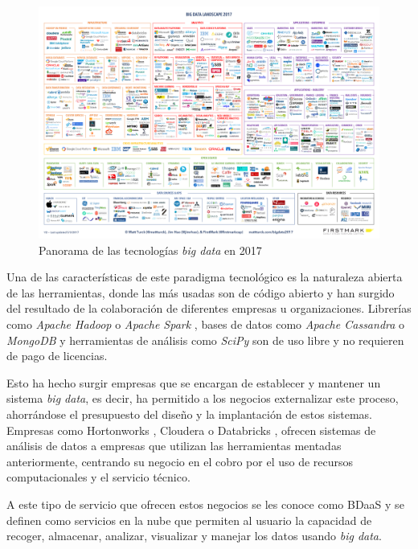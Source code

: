 \begin{figure}[htp!]
	\centering
	\caption{Panorama de las tecnologías \textit{big data} en 2017 \cite{landscape}}
	\label{landscape}
	\vspace{5pt}
	\includegraphics[scale=0.22]{graphics/landscape}
\end{figure}

Una de las características de este paradigma tecnológico es la naturaleza abierta de las herramientas, donde las más usadas son de código abierto y han surgido del resultado de la colaboración de diferentes empresas u organizaciones. Librerías como \textit{Apache Hadoop} \cite{hadoop} o \textit{Apache Spark} \cite{spark}, bases de datos como \textit{Apache Cassandra} \cite{cassandra} o \textit{MongoDB} \cite{mongo} y herramientas de análisis como \textit{SciPy} \cite{scipy} son de uso libre y no requieren de pago de licencias.

Esto ha hecho surgir empresas que se encargan de establecer y mantener un sistema \textit{big data}, es decir, ha permitido a los negocios externalizar este proceso, ahorrándose el presupuesto del diseño y la implantación de estos sistemas. Empresas como Hortonworks \cite{horton}, Cloudera \cite{cloudera} o Databricks \cite{databricks}, ofrecen sistemas de análisis de datos a empresas que utilizan las herramientas mentadas anteriormente, centrando su negocio en el cobro por el uso de recursos computacionales y el servicio técnico.

A este tipo de servicio que ofrecen estos negocios se les conoce como \gls{BDaaS} y se definen como servicios en la nube que permiten al usuario la capacidad de recoger, almacenar, analizar, visualizar y manejar los datos usando \textit{big data}.

